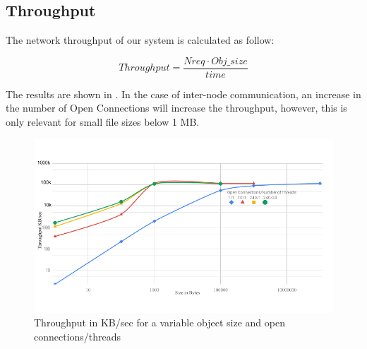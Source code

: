 \documentclass[runningheads]{llncs}
\begin{document}
\subsection{Throughput}
\begin{minipage}{0.5\textwidth}
The network throughput of our system is calculated as follow:
\end{minipage}
\begin{minipage}{0.5\textwidth}
\[Throughput=\frac{Nreq \cdot Obj\_size}{time}\]
\end{minipage}

The results are shown in .
In the case of inter-node communication, an increase in the number of Open Connections will increase the throughput, however, this is only relevant for small file sizes below 1 MB.

\begin{figure}[bt]
\includegraphics[width=1.0\textwidth]{throughput-to-size.png}\vspace{-0.5em}
\caption{Throughput in KB/sec for a variable object size and open connections/threads}\vspace{-1.5em}
\label{fig:throughput-to-size}
\end{figure}
\end{document}
